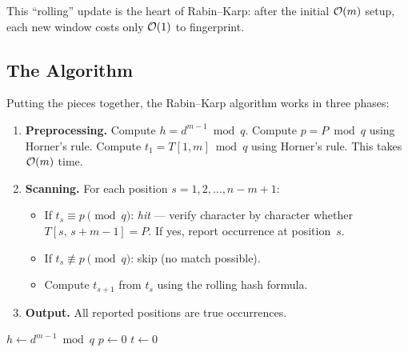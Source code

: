 This ``rolling'' update is the heart of Rabin--Karp: after the initial
$\mathcal{O}\!\left(m\right)$ setup, each new window costs only $\mathcal{O}\!\left(1\right)$ to fingerprint.

\subsection{The Algorithm}

Putting the pieces together, the Rabin--Karp algorithm works in three
phases:

\begin{enumerate}[nosep]
  \item \textbf{Preprocessing.}
        Compute $h = d^{m-1} \bmod q$.
        Compute $p = P \bmod q$ using Horner's rule.
        Compute $t_1 = T[1,m] \bmod q$ using Horner's rule.
        This takes $\mathcal{O}\!\left(m\right)$ time.

  \item \textbf{Scanning.}
        For each position $s = 1, 2, \ldots, n-m+1$:
        \begin{itemize}[nosep]
          \item If $t_s \equiv p \pmod{q}$: \emph{hit} --- verify
                character by character whether $T[s,\,s+m-1] = P$.
                If yes, report occurrence at position~$s$.
          \item If $t_s \not\equiv p \pmod{q}$: skip (no match possible).
          \item Compute $t_{s+1}$ from $t_s$ using the rolling hash
                formula.
        \end{itemize}

  \item \textbf{Output.} All reported positions are true occurrences.
\end{enumerate}

\begin{algorithm}[H]
  \caption{Rabin--Karp}
  \label{alg:rabin-karp}
  $h \gets d^{m-1} \bmod q$\;
  \BlankLine
  $p \gets 0$\;
  \BlankLine
  $t \gets 0$\;
  \BlankLine
\end{algorithm}

